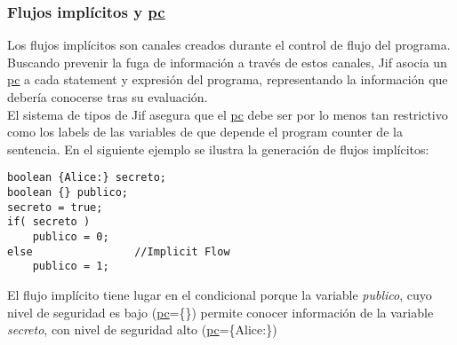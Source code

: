 \subsubsection{Flujos implícitos y \underline{pc}}
Los flujos implícitos son canales creados durante el control de flujo del
programa. Buscando prevenir la fuga de información a través de estos canales,
Jif asocia un \underline{pc} a cada statement y expresión del programa,
representando la información que debería conocerse tras su evaluación.\\
El sistema de tipos de Jif asegura que el \underline{pc} debe ser por
lo menos tan restrictivo como los labels de las variables de que depende el
program counter de la sentencia.\newline
En el siguiente ejemplo se ilustra la generación de flujos implícitos:
\begin{lstlisting}
boolean {Alice:} secreto;
boolean {} publico;
secreto = true;
if( secreto )		
	publico = 0;
else				//Implicit Flow
	publico = 1;
\end{lstlisting}

El flujo implícito tiene lugar en el condicional porque la variable
\emph{publico}, cuyo nivel de seguridad es bajo (\underline{pc}=\{\}) permite
conocer información de la variable \emph{secreto}, con nivel de seguridad alto
(\underline{pc}=\{Alice:\})















